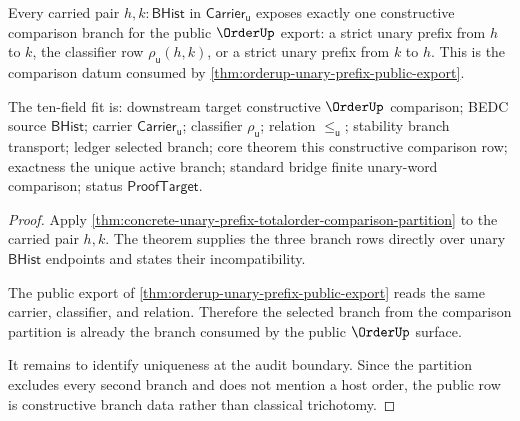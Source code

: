 \begin{theorem}
\label{thm:totalorder-orderup-public-audit-constructive-comparison}
Every carried pair $h,k:\mathsf{BHist}$ in
$\mathsf{Carrier}_{\mathsf{u}}$ exposes exactly one constructive comparison
branch for the public $\OrderUp$ export: a strict unary prefix from $h$ to $k$,
the classifier row $\rho_{\mathsf{u}}(h,k)$, or a strict unary prefix from $k$
to $h$. This is the comparison datum consumed by
\autoref{thm:orderup-unary-prefix-public-export}.

The ten-field fit is: downstream target constructive $\OrderUp$ comparison;
BEDC source $\mathsf{BHist}$; carrier $\mathsf{Carrier}_{\mathsf{u}}$;
classifier $\rho_{\mathsf{u}}$; relation $\le_{\mathsf{u}}$; stability branch
transport; ledger selected branch; core theorem this constructive comparison
row; exactness the unique active branch; standard bridge finite unary-word
comparison; status $\mathsf{ProofTarget}$.
\end{theorem}
\begin{proof}
Apply \autoref{thm:concrete-unary-prefix-totalorder-comparison-partition} to
the carried pair $h,k$. The theorem supplies the three branch rows directly
over unary $\mathsf{BHist}$ endpoints and states their incompatibility.

The public export of \autoref{thm:orderup-unary-prefix-public-export} reads
the same carrier, classifier, and relation. Therefore the selected branch from
the comparison partition is already the branch consumed by the public
$\OrderUp$ surface.

It remains to identify uniqueness at the audit boundary. Since the partition
excludes every second branch and does not mention a host order, the public row
is constructive branch data rather than classical trichotomy.
\end{proof}

